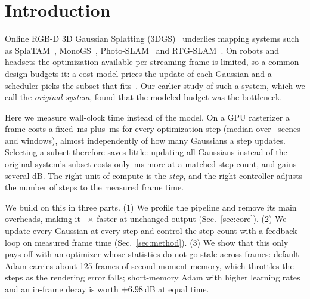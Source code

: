 \documentclass[10pt,twocolumn,letterpaper]{article}
\begin{document}
\section{Introduction}
Online RGB-D 3D Gaussian Splatting (3DGS)~\cite{kerbl3Dgaussians} underlies mapping systems such as SplaTAM~\cite{keetha2023splatam}, MonoGS~\cite{matsuki2024gaussian}, Photo-SLAM~\cite{huang2024photoslam} and RTG-SLAM~\cite{peng2024rtgslam}. On robots and headsets the optimization available per streaming frame is limited, so a common design budgets it: a cost model prices the update of each Gaussian and a scheduler picks the subset that fits~\cite{nemhauser1978analysis,sviridenko2004knapsack}. Our earlier study of such a system, which we call the \emph{original system}, found that the modeled budget was the bottleneck.

Here we measure wall-clock time instead of the model. On a GPU rasterizer a frame costs a fixed \engCostIntercept\,ms plus \engCostSlope\,ms for every optimization step (median over \engUnits\ scenes and windows), almost independently of how many Gaussians a step updates. Selecting a subset therefore saves little: updating all Gaussians instead of the original system's subset costs only \engSubsetTimeSaved\,ms more at a matched step count, and gains several dB. The right unit of compute is the \emph{step}, and the right controller adjusts the number of steps to the measured frame time.

We build on this in three parts. (1) We profile the pipeline and remove its main overheads, making it \engSpeedupMin--\engSpeedupMax$\times$ faster at unchanged output (Sec.~\ref{sec:core}). (2) We update every Gaussian at every step and control the step count with a feedback loop on measured frame time (Sec.~\ref{sec:method}). (3) We show that this only pays off with an optimizer whose statistics do not go stale across frames: default Adam carries about 125 frames of second-moment memory, which throttles the steps as the rendering error falls; short-memory Adam with higher learning rates and an in-frame decay is worth $+6.98$\,dB at equal time.
\end{document}
